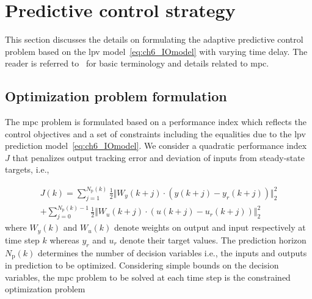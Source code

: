 \section{Predictive control strategy}\label{sec:ch6_MPC}
This section discusses the details on formulating the adaptive predictive control problem based on the \gls{lpv} model~\eqref{eq:ch6_IOmodel} with varying time delay. The reader is referred to~\cite{mpcbook} for basic terminology and details related to \gls{mpc}.

\subsection{Optimization problem formulation}\label{sec:ch6_probform}
The \gls{mpc} problem is formulated based on a performance index which reflects the control objectives and a set of constraints including the equalities due to the \gls{lpv} prediction model~\eqref{eq:ch6_IOmodel}. We consider a quadratic performance index~$J$ that penalizes output tracking error and deviation of inputs from steady-state targets, i.e.,

\small
\vspace{-1em}
\begin{multline*}
    J(k) = \sum\limits_{j=1}^{N_{\text{p}}(k)}\frac{1}{2}\Vert W_y(k+j)\cdot(y(k+j)-y_r(k+j))\Vert_2^2 \\ + \sum\limits_{j=0}^{N_{\text{p}}(k)-1} \frac{1}{2}\Vert W_u(k+j)\cdot (u(k+j)-u_r(k+j))\Vert_2^2
\end{multline*}
\normalsize
where $W_y(k)$ and $W_u(k)$ denote weights on output and input respectively at time step $k$ whereas $y_r$ and $u_r$ denote their target values. The prediction horizon $N_{\text{p}}(k)$ determines the number of decision variables i.e., the inputs and outputs in prediction to be optimized.
Considering simple bounds on the decision variables, the \gls{mpc} problem to be solved at each time step is the constrained optimization problem 

